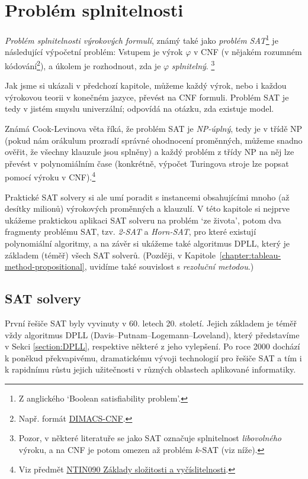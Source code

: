 \chapter{Problém splnitelnosti}

\emph{Problém splnitelnosti výrokových formulí}, známý také jako \emph{problém SAT}\footnote{Z anglického `Boolean satisfiability problem'.} je následující výpočetní problém: Vstupem je výrok $\varphi$ v CNF (v nějakém rozumném kódování\footnote{Např. formát \href{http://people.sc.fsu.edu/~jburkardt/data/cnf/cnf.html}{DIMACS-CNF}.}), a úkolem je rozhodnout, zda je $\varphi$ \emph{splnitelný}. \footnote{Pozor, v některé literatuře se jako SAT označuje splnitelnost \emph{libovolného} výroku, a na CNF je potom omezen až problém $k$-SAT (viz níže).}

Jak jsme si ukázali v předchozí kapitole, můžeme každý výrok, nebo i každou výrokovou teorii v konečném jazyce, převést na CNF formuli. Problém SAT je tedy v jistém smyslu univerzální; odpovídá na otázku, zda existuje model.

Známá Cook-Levinova věta říká, že problém SAT je \emph{NP-úplný}, tedy je v třídě NP (pokud nám orákulum prozradí správné ohodnocení proměnných, můžeme snadno ověřit, že všechny klauzule jsou splněny) a každý problém z třídy NP na něj lze převést v polynomiálním čase (konkrétně, výpočet Turingova stroje lze popsat pomocí výroku v CNF).\footnote{Viz předmět \href{https://is.cuni.cz/studium/predmety/index.php?do=predmet&kod=NTIN090}{NTIN090 Základy složitosti a vyčíslitelnosti}.}

Praktické SAT solvery si ale umí poradit s instancemi obsahujícími mnoho (až desítky milionů) výrokových proměnných a klauzulí. V této kapitole si nejprve ukážeme praktickou aplikaci SAT solveru na problém `ze života', potom dva fragmenty problému SAT, tzv. \emph{2-SAT} a \emph{Horn-SAT}, pro které existují polynomiální algoritmy, a na závěr si ukážeme také algoritmus DPLL, který je základem (téměř) všech SAT solverů. (Později, v Kapitole~\ref{chapter:tableau-method-propositional}, uvidíme také souvislost s \emph{rezoluční metodou}.)


\section{SAT solvery}

První řešiče SAT byly vyvinuty v 60. letech 20. století. Jejich základem je téměř vždy algoritmus DPLL (Davis–Putnam–Logemann–Loveland), který představíme v Sekci \ref{section:DPLL}, respektive některé z jeho vylepšení. Po roce 2000 dochází k poněkud překvapivému, dramatickému vývoji technologií pro řešiče SAT a tím i k rapidnímu růstu jejich užitečnosti v různých oblastech aplikované informatiky. 

